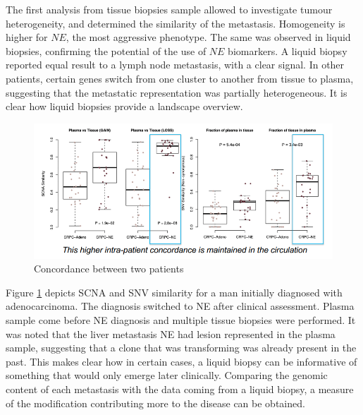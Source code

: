         The first analysis from tissue biopsies sample allowed to investigate tumour heterogeneity, and determined the similarity of the metastasis.
        Homogeneity is higher for $NE$, the most aggressive phenotype.
        The same was observed in liquid biopsies, confirming the potential of the use of $NE$ biomarkers.
        A liquid biopsy reported equal result to a lymph node metastasis, with a clear signal.
        In other patients, certain genes switch from one cluster to another from tissue to plasma, suggesting that the metastatic representation was partially heterogeneous.
        It is clear how liquid biopsies provide a landscape overview.

        \begin{figure}[H]
        \centering
            \includegraphics[width=0.7\linewidth]{case2.png}
            \caption{Concordance between two patients}
            \label{fig:case2}
        \end{figure}

        Figure \ref{fig:case2} depicts SCNA and SNV similarity for a man initially diagnosed with adenocarcinoma.
        The diagnosis switched to NE after clinical assessment.
        Plasma sample come before NE diagnosis and multiple tissue biopsies were performed.
        It was noted that the liver metastasis NE had lesion represented in the plasma sample, suggesting that a clone that was transforming was already present in the past.
        This makes clear how in certain cases, a liquid biopsy can be informative of something that would only emerge later clinically.
        Comparing the genomic content of each metastasis with the data coming from a liquid biopsy, a measure of the modification contributing more to the disease can be obtained.
